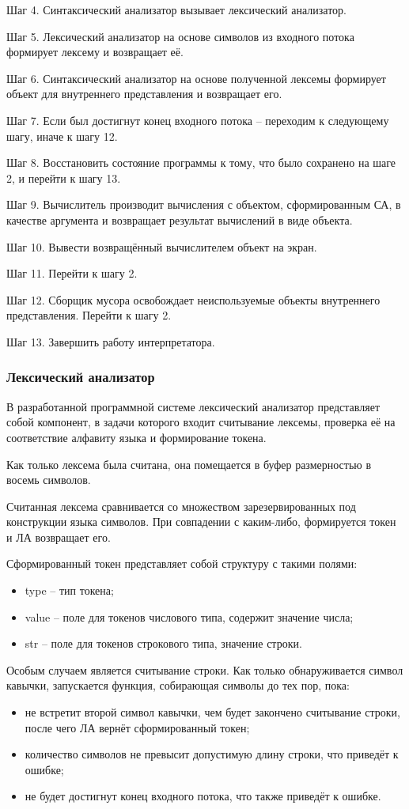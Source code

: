 Шаг 4. Синтаксический анализатор вызывает лексический анализатор.

Шаг 5. Лексический анализатор на основе символов из входного потока формирует лексему и возвращает её.

Шаг 6. Синтаксический анализатор на основе полученной лексемы формирует объект для внутреннего представления и возвращает его.

Шаг 7. Если был достигнут конец входного потока -- переходим к следующему шагу, иначе к шагу 12.

Шаг 8. Восстановить состояние программы к тому, что было сохранено на шаге 2, и перейти к шагу 13.

Шаг 9. Вычислитель производит вычисления с объектом, сформированным СА, в качестве аргумента и возвращает результат вычислений в виде объекта.

Шаг 10. Вывести возвращённый вычислителем объект на экран.

Шаг 11. Перейти к шагу 2.

Шаг 12. Сборщик мусора освобождает неиспользуемые объекты внутреннего представления. Перейти к шагу 2.

Шаг 13. Завершить работу интерпретатора.

\subsubsection{Лексический анализатор}
В разработанной программной системе лексический анализатор представляет собой компонент, в задачи которого входит считывание лексемы, проверка её на соответствие алфавиту языка и формирование токена.

Как только лексема была считана, она помещается в буфер размерностью в восемь символов.

Считанная лексема сравнивается со множеством зарезервированных под конструкции языка символов. При совпадении с каким-либо, формируется токен и ЛА возвращает его.


Сформированный токен представляет собой структуру с такими полями:
\begin{itemize}
	\item type -- тип токена;
	\item value -- поле для токенов числового типа, содержит значение числа;
	\item str -- поле для токенов строкового типа, значение строки.
\end{itemize}

Особым случаем является считывание строки. Как только обнаруживается символ кавычки, запускается функция, собирающая символы до тех пор, пока:
\begin{itemize}
	\item не встретит второй символ кавычки, чем будет закончено считывание строки, после чего ЛА вернёт сформированный токен;
	\item количество символов не превысит допустимую длину строки, что приведёт к ошибке;
	\item не будет достигнут конец входного потока, что также приведёт к ошибке.
\end{itemize}


